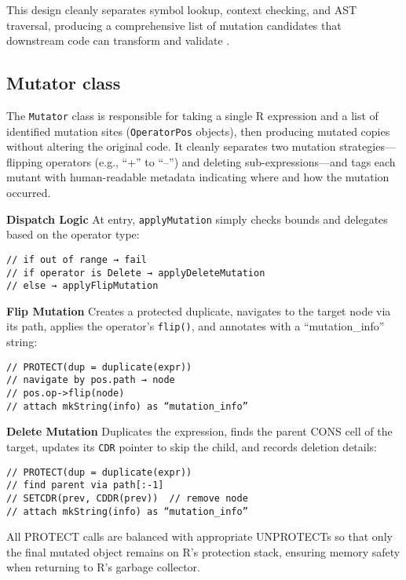 This design cleanly separates symbol lookup, context checking, and AST traversal, producing a comprehensive list of mutation candidates that downstream code can transform and validate \cite{rcore2024}.

\subsection{Mutator class}

The \texttt{Mutator} class is responsible for taking a single R expression and a list of identified mutation sites (\texttt{OperatorPos} objects), then producing mutated copies without altering the original code. It cleanly separates two mutation strategies—flipping operators (e.g., “+” to “–”) and deleting sub-expressions—and tags each mutant with human-readable metadata indicating where and how the mutation occurred.

\medskip
\noindent\textbf{Dispatch Logic}  
At entry, \texttt{applyMutation} simply checks bounds and delegates based on the operator type:

\begin{verbatim}
// if out of range → fail
// if operator is Delete → applyDeleteMutation
// else → applyFlipMutation
\end{verbatim}

\medskip
\noindent\textbf{Flip Mutation}  
Creates a protected duplicate, navigates to the target node via its path, applies the operator’s \texttt{flip()}, and annotates with a “mutation_info” string:

\begin{verbatim}
// PROTECT(dup = duplicate(expr))
// navigate by pos.path → node
// pos.op->flip(node)
// attach mkString(info) as “mutation_info”
\end{verbatim}

\medskip
\noindent\textbf{Delete Mutation}  
Duplicates the expression, finds the parent CONS cell of the target, updates its \texttt{CDR} pointer to skip the child, and records deletion details:

\begin{verbatim}
// PROTECT(dup = duplicate(expr))
// find parent via path[:-1]
// SETCDR(prev, CDDR(prev))  // remove node
// attach mkString(info) as “mutation_info”
\end{verbatim}

All PROTECT calls are balanced with appropriate UNPROTECTs so that only the final mutated object remains on R’s protection stack, ensuring memory safety when returning to R’s garbage collector.  


